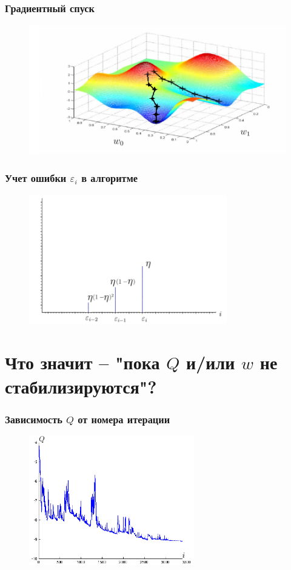 \documentclass[10pt]{beamer}
\begin{document}
\begin{frame}\frametitle{Градиентный спуск}
	\begin{figure}[htbp]
	  \includegraphics[height=160pt, keepaspectratio = true]{images/gradient_descent2}
	\end{figure}
\end{frame}

\begin{frame}\frametitle{Учет ошибки $\varepsilon_i$ в алгоритме}
	\begin{figure}[htbp]
	  \includegraphics[height=160pt, keepaspectratio = true]{images/l2}
	\end{figure}
\end{frame}

\section{Что значит -- "пока $Q$ и/или $w$ не стабилизируются"?}

\begin{frame}\frametitle{Зависимость $Q$ от номера итерации}
	\begin{figure}[htbp]
	  \includegraphics[height=160pt, keepaspectratio = true]{images/stochastic_gradient}
	\end{figure}
\end{frame}
\end{document}
